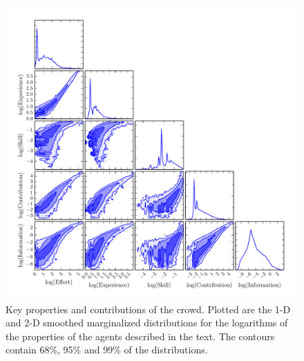\documentclass[useAMS,usenatbib,a4paper]{mn2e}
\begin{document}
\begin{figure}
\centering\includegraphics[width=0.9\linewidth]{all_skill_contribution_experience_education.pdf}
\caption{Key properties and contributions of the \SW \StageOne crowd.
Plotted are the 1-D
and 2-D smoothed marginalized distributions for  the logarithms of the
properties of the agents described in the text. The contours
contain 68\%, 95\% and 99\% of the distributions.}
\label{fig:crowd:cornerplot}
\end{figure}
\end{document}
